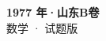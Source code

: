\documentclass[zihao=-4, a4paper]{ctexart}
\begin{document}
\begin{center}
  {\Large\bfseries 1977 年·山东B卷}\\[4pt]
  {\large 数学 · 试题版}
\end{center}
\medskip
{}

\end{document}

